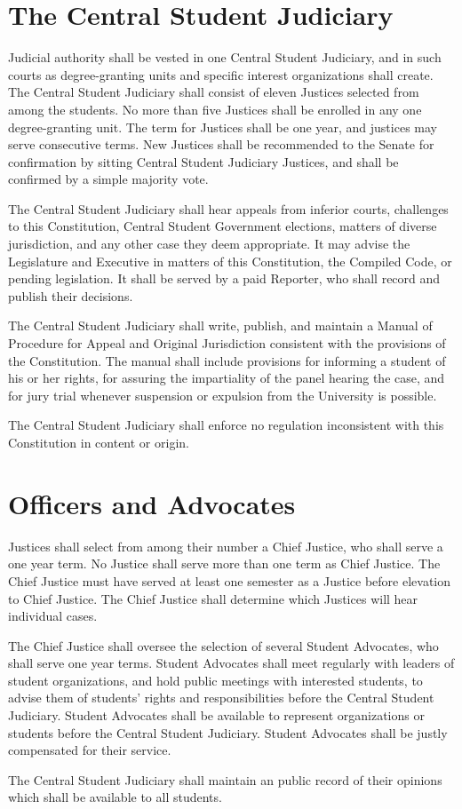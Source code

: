\section{The Central Student Judiciary}
    Judicial authority shall be vested in one Central Student Judiciary, and in such courts as degree-granting units and specific interest organizations shall create. The Central Student Judiciary shall consist of eleven Justices selected from among the students. No more than five Justices shall be enrolled in any one degree-granting unit. The term for Justices shall be one year, and justices may serve consecutive terms. New Justices shall be recommended to the Senate for confirmation by sitting Central Student Judiciary Justices, and shall be confirmed by a simple majority vote.

    The Central Student Judiciary shall hear appeals from inferior courts, challenges to this Constitution, Central Student Government elections, matters of diverse jurisdiction, and any other case they deem appropriate. It may advise the Legislature and Executive in matters of this Constitution, the Compiled Code, or pending legislation. It shall be served by a paid Reporter, who shall record and publish their decisions.

    The Central Student Judiciary shall write, publish, and maintain a Manual of Procedure for Appeal and Original Jurisdiction consistent with the provisions of the Constitution. The manual shall include provisions for informing a student of his or her rights, for assuring the impartiality of the panel hearing the case, and for jury trial whenever suspension or expulsion from the University is possible.

    The Central Student Judiciary shall enforce no regulation inconsistent with this Constitution in content or origin.

\section{Officers and Advocates}
    Justices shall select from among their number a Chief Justice, who shall serve a one year term. No Justice shall serve more than one term as Chief Justice. The Chief Justice must have served at least one semester as a Justice before elevation to Chief Justice. The Chief Justice shall determine which Justices will hear individual cases.

    The Chief Justice shall oversee the selection of several Student Advocates, who shall serve one year terms. Student Advocates shall meet regularly with leaders of student organizations, and hold public meetings with interested students, to advise them of students' rights and responsibilities before the Central Student Judiciary. Student Advocates shall be available to represent organizations or students before the Central Student Judiciary. Student Advocates shall be justly compensated for their service.

    The Central Student Judiciary shall maintain an public record of their opinions which shall be available to all students.
